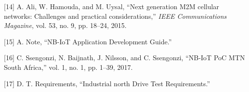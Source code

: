 \documentclass[]{article}
\begin{document}
\leavevmode\hypertarget{ref-Ali2015}{}%
{[}14{]} A. Ali, W. Hamouda, and M. Uysal, ``Next generation M2M
cellular networks: Challenges and practical considerations,'' \emph{IEEE
Communications Magazine}, vol. 53, no. 9, pp. 18--24, 2015.

\leavevmode\hypertarget{ref-ubloxAppNote2018}{}%
{[}15{]} A. Note, ``NB-IoT Application Development Guide.''

\leavevmode\hypertarget{ref-Ssengonzi2017}{}%
{[}16{]} C. Ssengonzi, N. Baijnath, J. Nilsson, and C. Ssengonzi,
``NB-IoT PoC MTN South Africa,'' vol. 1, no. 1, pp. 1--39, 2017.

\leavevmode\hypertarget{ref-NorthDrive2017}{}%
{[}17{]} D. T. Requirements, ``Industrial north Drive Test
Requirements.''
\end{document}
